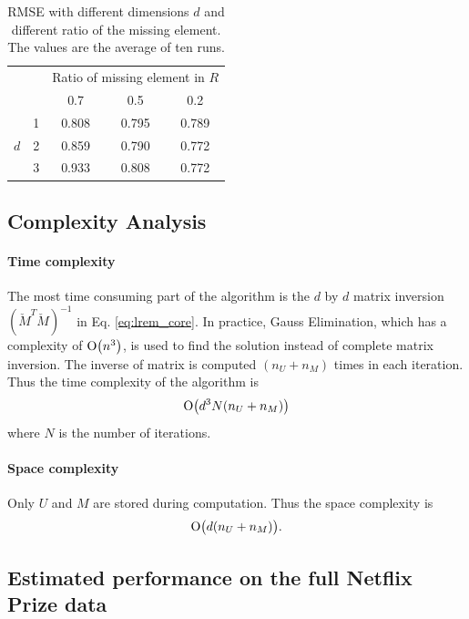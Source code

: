 \documentclass{article}
\begin{document}
\begin{table}[ht]
 \caption{RMSE with different dimensions $d$ and different ratio of the missing element. The values are the average of ten runs.}
 \label{table:lrem_result}
 \begin{center}
  \begin{tabular}{|c|c||c|c|c|}
    \hline
    \multicolumn{2}{|c|}{}  & \multicolumn{3}{|c|}{Ratio of missing element in $R$} \\
    \cline{3-5}
     \multicolumn{2}{|c|}{}    &  0.7  &  0.5  & 0.2   \\
    \hline
    \hline
       & 1 &  0.808  &  0.795  &  0.789  \\
    \cline{2-5}
     $d$ & 2 &  0.859  &  0.790  & 0.772   \\
    \cline{2-5}
     & 3 &  0.933  &  0.808  &  0.772  \\
    \hline
  \end{tabular}
 \end{center}
\end{table}

\subsection{Complexity Analysis}
\paragraph{Time complexity} 
The most time consuming part of the algorithm is the $d$ by $d$ matrix inversion $(\check{M}^T\check{M})^{-1}$ in Eq. \ref{eq:lrem_core}. In practice, Gauss Elimination, which has a complexity of $\operatorname{O}\bigl(n^3\bigr)$, is used to find the solution instead of complete matrix inversion. The inverse of matrix is computed $(n_U+n_M)$ times in each iteration. Thus the time complexity of the algorithm is 
\begin{equation}
\operatorname{O}\bigl(d^3N(n_U+n_M)\bigr)
\end{equation}
where $N$ is the number of iterations.

\paragraph{Space complexity}
Only $U$ and $M$ are stored during computation. Thus the space complexity is
\begin{equation}
\operatorname{O}\bigl(d(n_U+n_M)\bigr).
\end{equation}

\subsection{Estimated performance on the full Netflix Prize data}
\end{document}
